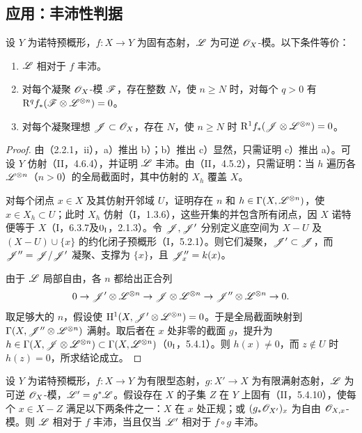 \subsection{应用：丰沛性判据}
设 $Y$ 为诺特预概形，$f:X\to Y$ 为固有态射，$\mathscr L$ 为可逆 $\mathscr O_X$-模。以下条件等价：
\begin{enumerate}[label=\alph*)]
\item $\mathscr L$ 相对于 $f$ 丰沛。
\item 对每个凝聚 $\mathscr O_X$-模 $\mathscr F$，存在整数 $N$，使 $n\geq N$ 时，对每个 $q>0$ 有 $\mathrm R^qf_*(\mathscr F\otimes\mathscr L^{\otimes n})=0$。
\item 对每个凝聚理想 $\mathscr J\subset\mathscr O_X$，存在 $N$，使 $n\geq N$ 时 $\mathrm R^1f_*(\mathscr J\otimes\mathscr L^{\otimes n})=0$。
\end{enumerate}
\begin{proof}
由（2.2.1，ii），a）推出 b）；b）推出 c）显然，只需证明 c）推出 a）。可设 $Y$ 仿射（II，4.6.4），并证明 $\mathscr L$ 丰沛。由（II，4.5.2），只需证明：当 $h$ 遍历各 $\mathscr L^{\otimes n}$（$n>0$）的全局截面时，其中仿射的 $X_h$ 覆盖 $X$。

对每个闭点 $x\in X$ 及其仿射开邻域 $U$，证明存在 $n$ 和 $h\in\Gamma(X,\mathscr L^{\otimes n})$，使 $x\in X_h\subset U$；此时 $X_h$ 仿射（I，1.3.6），这些开集的并包含所有闭点，因 $X$ 诺特便等于 $X$（I，6.3.7及$0_{\mathrm I}$，2.1.3）。令 $\mathscr J,\mathscr J'$ 分别定义底空间为 $X-U$ 及 $(X-U)\cup\{x\}$ 的约化闭子预概形（I，5.2.1）。则它们凝聚，$\mathscr J'\subset\mathscr J$，而 $\mathscr J''=\mathscr J/\mathscr J'$ 凝聚、支撑为 $\{x\}$，且 $\mathscr J''_x=k(x)$。

由于 $\mathscr L$ 局部自由，各 $n$ 都给出正合列
\[
0\to\mathscr J'\otimes\mathscr L^{\otimes n}\to\mathscr J\otimes\mathscr L^{\otimes n}\to\mathscr J''\otimes\mathscr L^{\otimes n}\to0.
\]
取足够大的 $n$，假设使 $\mathrm H^1(X,\mathscr J'\otimes\mathscr L^{\otimes n})=0$。于是全局截面映射到 $\Gamma(X,\mathscr J''\otimes\mathscr L^{\otimes n})$ 满射。取后者在 $x$ 处非零的截面 $g$，提升为 $h\in\Gamma(X,\mathscr J\otimes\mathscr L^{\otimes n})\subset\Gamma(X,\mathscr L^{\otimes n})$（$0_{\mathrm I}$，5.4.1）。则 $h(x)\ne0$，而 $z\notin U$ 时 $h(z)=0$，所求结论成立。
\end{proof}

设 $Y$ 为诺特预概形，$f:X\to Y$ 为有限型态射，$g:X'\to X$ 为有限满射态射，$\mathscr L$ 为可逆 $\mathscr O_X$-模，$\mathscr L'=g^*\mathscr L$。假设存在 $X$ 的子集 $Z$ 在 $Y$ 上固有（II，5.4.10），使每个 $x\in X-Z$ 满足以下两条件之一：$X$ 在 $x$ 处正规；或 $(g_*\mathscr O_{X'})_x$ 为自由 $\mathscr O_{X,x}$-模。则 $\mathscr L$ 相对于 $f$ 丰沛，当且仅当 $\mathscr L'$ 相对于 $f\circ g$ 丰沛。

